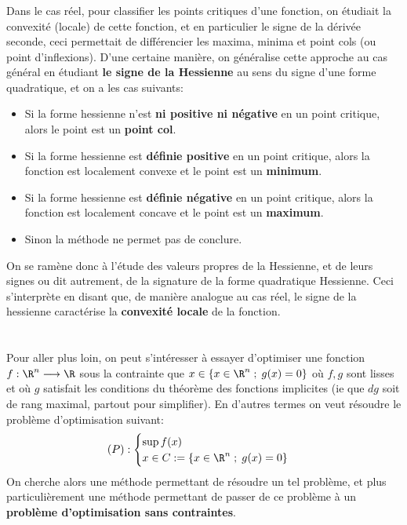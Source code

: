 \subsection*{}
Dans le cas réel, pour classifier les points critiques d'une fonction, on étudiait la convexité (locale) de cette fonction, et en particulier le signe de la dérivée seconde, ceci permettait de différencier les maxima, minima et point cols (ou point d'inflexions). D'une certaine manière, on généralise cette approche au cas général en étudiant \textbf{le signe de la Hessienne} au sens du signe d'une forme quadratique, et on a les cas suivants:
\begin{itemize}
   \item Si la forme hessienne n'est \textbf{ni positive ni négative} en un point critique, alors le point est un \textbf{point col}.

   \item Si la forme hessienne est \textbf{définie positive} en un point critique, alors la fonction est localement convexe et le point est un \textbf{minimum}.
   \item Si la forme hessienne est \textbf{définie négative} en un point critique, alors la fonction est localement concave et le point est un \textbf{maximum}.
   \item Sinon la méthode ne permet pas de conclure.
\end{itemize}
On se ramène donc à l'étude des valeurs propres de la Hessienne, et de leurs signes ou dit autrement, de la signature de la forme quadratique Hessienne. Ceci s'interprète en disant que, de manière analogue au cas réel, le signe de la hessienne caractérise la \textbf{convexité locale} de la fonction.

\chapter*{}
Pour aller plus loin, on peut s'intéresser à essayer d'optimiser une fonction \( f : \R^n \longrightarrow \R \) sous la contrainte que \(x \in \left\{ x \in \R^n \; ; \; g(x) = 0 \right\}\) où \( f, g \) sont lisses et où \( g \) satisfait les conditions du théorème des fonctions implicites (ie que \( dg \) soit de rang maximal, partout pour simplifier). En d'autres termes on veut résoudre le problème d'optimisation suivant:
\[ 
   (P) :\begin{cases}
      \sup f(x)\\
      x \in C := \left\{ x \in \R^n \; ; \; g(x) = 0 \right\} 
   \end{cases} 
\] 
On cherche alors une méthode permettant de résoudre un tel problème, et plus particulièrement une méthode permettant de passer de ce problème à un \textbf{problème d'optimisation sans contraintes}.

